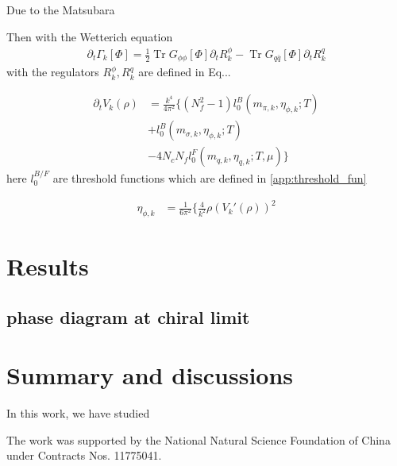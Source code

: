 \documentclass[%
reprint,
superscriptaddress,
showpacs,preprintnumbers,
 amsmath,amssymb,
 aps,
prd,
]{revtex4-1}
\newcommand{\Tr}{\ensuremath{\operatorname{Tr}}}
\begin{document}
Due to the Matsubara
 
Then with the Wetterich equation
\begin{align}
	\partial_t \Gamma_k [\Phi] = \frac{1}{2}\Tr G_{\phi \phi} [\Phi]  \partial_t R^\phi_k-\Tr G_{q \bar q}[\Phi] \partial_t R^q_k
\end{align}
with the regulators $R^\phi_k,R^q_k$ are defined in Eq{...}

\begin{align}
	\partial_t V_k(\rho) &=\frac{k^4}{4 \pi^2} \{ ( N_f^2-1)l_0^B(m_{\pi,k},\eta_{\phi,k} ; T)\nonumber\\[2ex]
	&+l_0^B(m_{\sigma,k},\eta_{\phi,k}; T) \nonumber\\[2ex]
	&-4N_c N_f l_0^F(m_{q,k},\eta_{q,k};T,\mu)\}
\end{align}
here $l_0^{B/F}$ are threshold functions which are defined in \ref{app:threshold_fun}

\begin{align}
	\eta_{\phi,k}&=\frac{1}{6\pi^2} \Big\{ \frac{4}{k^2} \rho (V_k'(\rho))^2
\end{align}
\section{Results}
\label{sec:Results}

\subsection{phase diagram at chiral limit}


\section{Summary and discussions}
\label{sec:sum}

In this work, we have studied


\begin{acknowledgments}

The work was supported by the National Natural Science Foundation of China under Contracts Nos. 11775041.

\end{acknowledgments}
\end{document}
